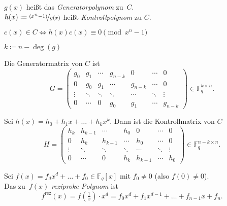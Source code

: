 \documentclass{cheat-sheet}
\newcommand{\F}{\mathbb{F}} %
\newcommand{\rez}{\mathrm{rez}} %
\begin{document}
\begin{defn}
  \begin{minipage}[t]{0.8 \linewidth}
    $g(x)$ heißt das \emph{Generatorpolynom} zu~$C$. \\
    $h(x) \coloneqq \nicefrac{(x^n - 1)}{g(x)}$ heißt \emph{Kontrollpolynom} zu $C$.
  \end{minipage}
\end{defn}

\begin{lem}
  $c(x) \in C \iff h(x) c(x) \equiv 0 \pmod{x^n - 1}$
\end{lem}

\begin{nota}
  $k \coloneqq n - \deg(g)$
\end{nota}

\begin{bem}
  Die Generatormatrix von $C$ ist
  \[
    G = \begin{pmatrix}
      g_0 & g_1 & \cdots & g_{n-k} & 0 & \cdots & 0 \\
      0 & g_0 & g_1 & \cdots & g_{n-k} & \cdots & 0 \\
      \vdots & \ddots & \ddots & \ddots & \cdots & \ddots & \vdots \\
      0 & \cdots & 0 & g_0 & g_1 & \cdots & g_{n-k}
    \end{pmatrix} \in \F_q^{k \times n}.
  \]
\end{bem}

\begin{prop}
  Sei $h(x) = h_0 + h_1 x + \ldots + h_k x^k$.
  Dann ist die Kontrollmatrix von $C$
  \[
    H = \begin{pmatrix}
      h_k & h_{k-1} & \cdots & h_0 & 0 & \cdots & 0 \\
      0 & h_k & h_{k-1} & \cdots & h_0 & \cdots & 0 \\
      \vdots & \ddots & \ddots & \ddots & \cdots & \ddots & \vdots \\
      0 & \cdots & 0 & h_k & h_{k-1} & \cdots & h_0
    \end{pmatrix} \in \F_q^{n - k \times n}.
  \]
\end{prop}


\begin{defn}
  Sei $f(x) = f_d x^d + \ldots + f_0 \in \F_q[x]$ mit $f_0 \neq 0$ (also $f(0) \neq 0$). \\
  Das zu~$f(x)$ \emph{reziproke Polynom} ist
  \[
    f^\rez(x) = f(\tfrac{1}{x}) \cdot x^d = f_0 x^d + f_1 x^{d-1} + \ldots + f_{n-1} x + f_n.
  \]
\end{defn}
\end{document}
